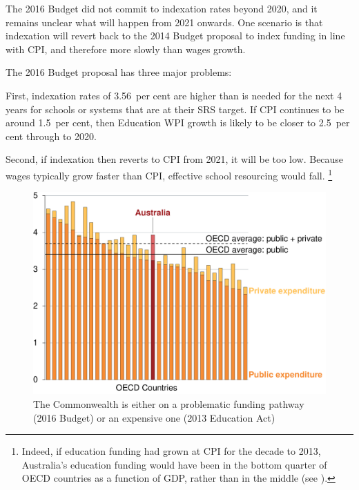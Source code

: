\documentclass{grattan}
\begin{document}
The 2016 Budget did not commit to indexation rates beyond 2020, and it remains unclear what will happen from 2021 onwards.
One scenario is that indexation will revert back to the 2014 Budget proposal to index funding in line with CPI, and therefore more slowly than wages growth.

The 2016 Budget proposal has three major problems:

First, indexation rates of 3.56~per cent are higher than is needed for the next 4 years for schools or systems that are at their SRS target.
If CPI continues to be around 1.5~per cent, then Education WPI growth is likely to be closer to 2.5~per cent through to 2020.

Second, if indexation then reverts to CPI from 2021, it will be too low.
Because wages typically grow faster than CPI, effective school resourcing would fall.%
\footnote{Indeed, if education funding had grown at CPI for the decade to 2013, Australia's education funding would have been in the bottom quarter of OECD countries as a function of GDP, rather than in the middle (see ).}

\begin{figure}[p]
\caption{The Commonwealth is either on a problematic funding pathway (2016 Budget) or an expensive one (2013 Education Act)}\label{fig:neither-indexation-pathway-is-desirable}


\includegraphics[page=11]{atlas/Charts.pdf}
\end{figure}
\end{document}
